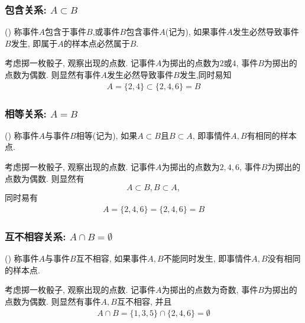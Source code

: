 \documentclass[Prob-All.tex]{subfiles}
\begin{document}
\begin{frame}
  \frametitle{包含关系: $A\subset B$}
  \begin{defi} () 称事件$A$包含于事件$B$,或事件$B$包含事件$A$(记为), 如果事件$A$发生必然导致事件$B$发生, 即属于$A$的样本点必然属于$B$.
  \end{defi}
  \pause
  \begin{exam}
    考虑掷一枚骰子, 观察出现的点数. 记事件$A$为掷出的点数为$2$或$4$, 事件$B$为掷出的点数为偶数. 则显然有事件$A$发生必然导致事件$B$发生,同时易知
    \begin{eqnarray*}
      A=\{2,4\}\subset \{2,4,6\}=B
    \end{eqnarray*}
  \end{exam}
\end{frame}

\begin{frame}
  \frametitle{相等关系: $A=B$}
  \begin{defi} () 称事件$A$与事件$B$相等(记为), 如果$A\subset B$且$B\subset A$, 即事情件$A,B$有相同的样本点.
  \end{defi}

  \pause
  \begin{exam}
    考虑掷一枚骰子, 观察出现的点数. 记事件$A$为掷出的点数为$2,4,6$, 事件$B$为掷出的点数为偶数. 则显然有
    \[A\subset B, B\subset A,\] 同时易有
    \begin{eqnarray*}
      A=\{2,4, 6\}=\{2,4,6\}=B
    \end{eqnarray*}

  \end{exam}
\end{frame}
\begin{frame}
  \frametitle{互不相容关系: $A\cap B=\emptyset$}
  \begin{defi} () 称事件$A$与事件$B$互不相容, 如果事件$A, B$不能同时发生, 即事情件$A,B$没有相同的样本点.
  \end{defi}

  \pause
  \vspace{1cm}
  \begin{exam}
    考虑掷一枚骰子, 观察出现的点数. 记事件$A$为掷出的点数为奇数, 事件$B$为掷出的点数为偶数. 则显然有事件$A,B$互不相容, 并且
    \begin{eqnarray*}
      A\cap B=\{1,3,5\}\cap \{2,4,6\}=\emptyset
    \end{eqnarray*}

  \end{exam}
\end{frame}
\end{document}
